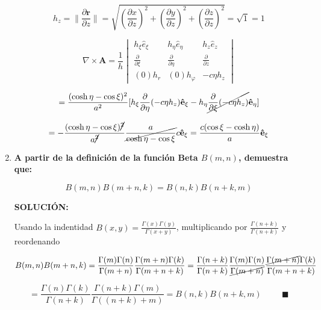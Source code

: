 \documentclass[12pt,a4paper]{article}
\providecommand{\norm}[1]{\lVert#1\rVert}
\begin{document}
\begin{enumerate}
    
    
    \begin{equation*}
        h_z = \norm{\frac{\partial \mathbf{r}}{\partial z}} = \sqrt{\left(\frac{\partial x}{\partial z}\right)^2 + \left(\frac{\partial y}{\partial z}\right)^2 + \left(\frac{\partial z}{\partial z}\right)^2} = \sqrt{1} = 1
    \end{equation*}
    
    \begin{equation*}
        \nabla \times \mathbf{A} = \frac{1}{h}
            \begin{vmatrix}
                h_\xi \hat{e}_\xi & h_\eta \hat{e}_\eta & h_z \hat{e}_z\\
                \frac{\partial}{\partial \xi} & \frac{\partial }{\partial \eta} & \frac{\partial}{\partial z}\\
                (0) h_r & (0) h_\varphi & -c\eta h_z
            \end{vmatrix}
    \end{equation*}
    
    \begin{equation*}
        =\frac{(\cosh{\eta}- \cos{\xi})^2}{a^2} [h_\xi \frac{\partial}{\partial \eta}(-c\eta h_z)\mathbf{\hat{e}}_\xi-h_\eta \cancel{\frac{\partial}{\partial \xi}(-c\eta h_z)}\mathbf{\hat{e}}_\eta]
    \end{equation*}
    
    \begin{equation*}
        =-\frac{(\cosh{\eta}- \cos{\xi})\cancel{^2}}{a\cancel{^2}} \cancel{\frac{a}{\cosh{\eta}- \cos{\xi}}} c\mathbf{\hat{e}}_\xi = \frac{c(\cos{\xi}-\cosh{\eta})}{a} \mathbf{\hat{e}}_\xi
    \end{equation*}
    
    
    



    \item \textbf{A partir de la definición de la función Beta $B(m,n)$, demuestra que:}
    
    \begin{equation*}
        B(m,n)B(m+n,k) = B(n,k)B(n+k,m)
    \end{equation*}
    
    \textbf{SOLUCIÓN:}
    
    Usando la indentidad $B(x,y)= \frac{\Gamma(x) \Gamma(y)}{\Gamma(x+y)}$, multiplicando por $\frac{\Gamma(n+k)}{\Gamma(n+k)}$ y reordenando 
    
    \begin{equation*}
        B(m,n)B(m+n,k) = \frac{\Gamma(m)\Gamma(n)}{\Gamma(m+n)} \frac{\Gamma(m+n) \Gamma(k)}{\Gamma(m+n+k)}= \frac{\Gamma(n+k)}{\Gamma(n+k)} \frac{\Gamma(m)\Gamma(n)}{\cancel{\Gamma(m+n)}} \frac{\cancel{\Gamma(m+n)} \Gamma(k)}{\Gamma(m+n+k)}
    \end{equation*}
    
    \begin{equation*}
        = \frac{\Gamma(n)\Gamma(k)}{\Gamma(n+k)} \frac{\Gamma(n+k)\Gamma(m)}{\Gamma((n+k)+m)} = B(n,k)B(n+k,m) \hspace{1cm} \blacksquare
    \end{equation*}
\end{enumerate}
\end{document}
